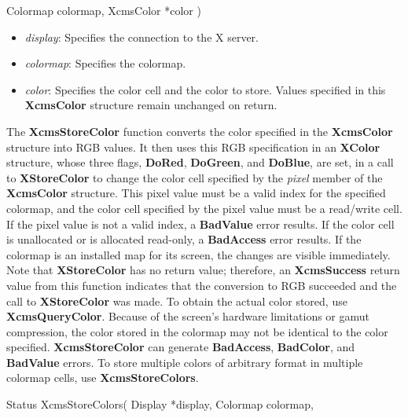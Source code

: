 \documentclass{report}
\begin{document}
\begin{itemize}
\begin{cppcode}
                    Colormap colormap,
                    XcmsColor *color
                )
            \end{cppcode}
            \bigbreak \noindent
            \begin{itemize}
                \item \textit{display}: Specifies the connection to the X server.
                \item \textit{colormap}: Specifies the colormap.
                \item \textit{color}: Specifies the color cell and the color to store. Values specified in this \textbf{XcmsColor} structure remain unchanged on return.
            \end{itemize}
            \noindent
            The \textbf{XcmsStoreColor} function converts the color specified in the \textbf{XcmsColor} structure into RGB values. It then uses this RGB specification in an \textbf{XColor} structure, whose three flags, \textbf{DoRed}, \textbf{DoGreen}, and \textbf{DoBlue}, are set, in a call to \textbf{XStoreColor} to change the color cell specified by the \textit{pixel} member of the \textbf{XcmsColor} structure.
            \bigbreak \noindent
            This pixel value must be a valid index for the specified colormap, and the color cell specified by the pixel value must be a read/write cell. If the pixel value is not a valid index, a \textbf{BadValue} error results. If the color cell is unallocated or is allocated read-only, a \textbf{BadAccess} error results. If the colormap is an installed map for its screen, the changes are visible immediately.
            \bigbreak \noindent
            Note that \textbf{XStoreColor} has no return value; therefore, an \textbf{XcmsSuccess} return value from this function indicates that the conversion to RGB succeeded and the call to \textbf{XStoreColor} was made. To obtain the actual color stored, use \textbf{XcmsQueryColor}. Because of the screen's hardware limitations or gamut compression, the color stored in the colormap may not be identical to the color specified.
            \bigbreak \noindent
            \textbf{XcmsStoreColor} can generate \textbf{BadAccess}, \textbf{BadColor}, and \textbf{BadValue} errors.
            \bigbreak \noindent
            To store multiple colors of arbitrary format in multiple colormap cells, use \textbf{XcmsStoreColors}.
            \bigbreak \noindent
            \begin{cppcode}
                Status XcmsStoreColors(
                    Display *display,
                    Colormap colormap,

\end{cppcode}
\end{itemize}
\end{document}
